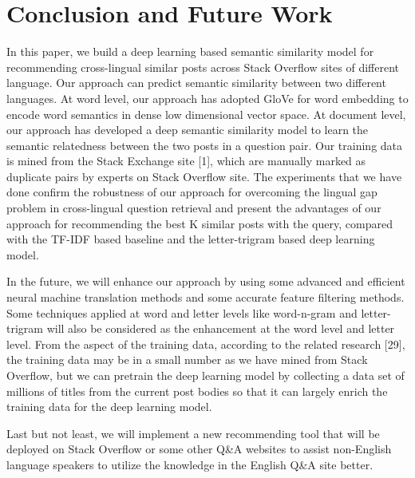 \chapter{Conclusion and Future Work}

In this paper, we build a deep learning based semantic similarity model for recommending cross-lingual similar posts across Stack Overflow sites of different language. Our approach can predict semantic similarity between two different languages. At word level, our approach has adopted GloVe for word embedding to encode word semantics in dense low dimensional vector space. At document level, our approach has developed a deep semantic similarity model to learn the semantic relatedness between the two posts in a question pair. Our training data is mined from the Stack Exchange site [1], which are manually marked as duplicate pairs by experts on Stack Overflow site. The experiments that we have done confirm the robustness of our approach for overcoming the lingual gap problem in cross-lingual question retrieval and present the advantages of our approach for recommending the best K similar posts with the query, compared with the TF-IDF based baseline and the letter-trigram based deep learning model.


\par

In the future, we will enhance our approach by using some advanced and efficient neural machine translation methods and some accurate feature filtering methods. Some techniques applied at word and letter levels like word-n-gram and letter-trigram will also be considered as the enhancement at the word level and letter level. From the aspect of the training data, according to the related research [29], the training data may be in a small number as we have mined from Stack Overflow, but we can pretrain the deep learning model by collecting a data set of millions of titles from the current post bodies so that it can largely enrich the training data for the deep learning model. 


\par

Last but not least, we will implement a new recommending tool that will be deployed on Stack Overflow or some other Q\&A websites to assist non-English language speakers to utilize the knowledge in the English Q\&A site better.